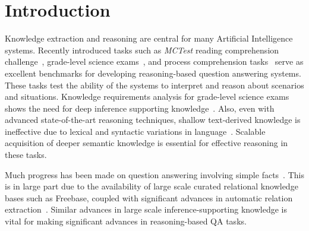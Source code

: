 \section{Introduction}

Knowledge extraction and reasoning are central for many Artificial Intelligence systems. 
Recently introduced tasks such as {\em MCTest} reading comprehension challenge~\cite{richardson2013mctest}, grade-level science exams~\cite{clark2015elementary}, and process comprehension tasks~\cite{berantSrikumar14} serve as excellent benchmarks for developing reasoning-based question answering systems. 
These tasks test the ability of the systems to interpret and reason about scenarios and situations.
Knowledge requirements analysis for grade-level science exams shows the need for deep inference supporting knowledge~\cite{chb2013:akbc,clark2014:akbc}.
Also, even with advanced state-of-the-art reasoning techniques, shallow text-derived knowledge is ineffective due to lexical and syntactic variations in language~\cite{khot2015:emlnlp}.
Scalable acquisition of deeper semantic knowledge is essential for effective reasoning in these tasks. 

Much progress has been made on question answering involving simple facts~\cite{berant2013semantic,fader2014open,bordes2014open,reddy2014large}. 
This is in large part due to the availability of large scale curated relational knowledge bases such as Freebase, coupled with significant advances in automatic relation extraction~\cite{schmitz2012open,carlson2010toward,suchanek2007yago}. 
Similar advances in large scale inference-supporting knowledge is vital for making significant advances in reasoning-based QA tasks.


